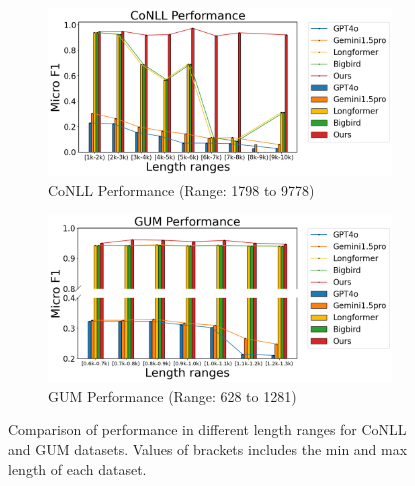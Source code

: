 \documentclass[11pt]{article}
\begin{document}
\begin{figure}[!htp]
    \begin{subfigure}[b]{0.47\linewidth}   
        \includegraphics[width=\textwidth]{images/output_conll.png} %
        \caption{CoNLL Performance (Range: 1798 to 9778)}
        \label{fig:conll_results}
    \end{subfigure}
    \hfill
    \begin{subfigure}[b]{0.47\linewidth}  
        \includegraphics[width=\textwidth]{images/output_gum.png} %
        \caption{GUM Performance (Range: 628 to 1281)}
        \label{fig:gum_results}
    \end{subfigure}
    \caption{Comparison of performance in different length ranges for CoNLL and GUM datasets. Values of brackets includes the min and max length of each dataset.}
    \label{fig:combined_results}
    \vspace{-10pt}
\end{figure}
\end{document}
